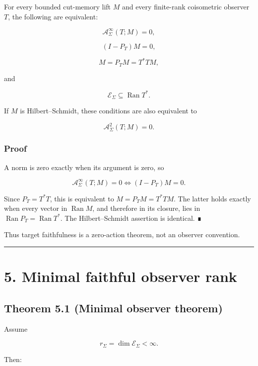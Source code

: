 For every bounded cut-memory lift \(M\) and every finite-rank coisometric
observer \(T\), the following are equivalent:

\[
\mathcal A_\Sigma^{\infty}(T;M)=0,
\]

\[
(I-P_T)M=0,
\]

\[
M=P_TM=T^*TM,
\]

and

\[
\mathcal E_\Sigma
\subseteq
\operatorname{Ran}T^*.
\]

If \(M\) is Hilbert--Schmidt, these conditions are also equivalent to

\[
\mathcal A_\Sigma^{2}(T;M)=0.
\]

\hypertarget{proof}{%
\subsubsection{Proof}\label{proof}}

A norm is zero exactly when its argument is zero, so

\[
\mathcal A_\Sigma^{\infty}(T;M)=0
\iff
(I-P_T)M=0.
\]

Since \(P_T=T^*T\), this is equivalent to \(M=P_TM=T^*TM\). The latter holds
exactly when every vector in \(\operatorname{Ran}M\), and therefore in its
closure, lies in \(\operatorname{Ran}P_T=\operatorname{Ran}T^*\). The
Hilbert--Schmidt assertion is identical. ∎

Thus target faithfulness is a zero-action theorem, not an observer convention.

\begin{center}\rule{0.5\linewidth}{0.5pt}\end{center}

\hypertarget{minimal-faithful-observer-rank}{%
\section{5. Minimal faithful observer rank}\label{minimal-faithful-observer-rank}}

\hypertarget{theorem-5.1-minimal-observer-theorem}{%
\subsection{Theorem 5.1 (Minimal observer theorem)}\label{theorem-5.1-minimal-observer-theorem}}

Assume

\[
r_\Sigma
=
\dim\mathcal E_\Sigma
<\infty.
\]

Then:

